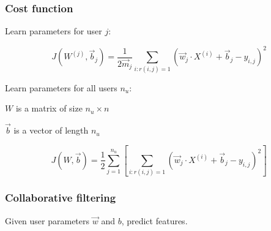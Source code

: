 \documentclass[12pt]{article}
\begin{document}
\subsubsection{Cost function}

Learn parameters for user $j$:

\[ J(W^{(j)},\vec{b}_j) = \frac{1}{2\vec m_j} \sum_{i:r(i,j)=1} (\vec w_j \cdot X^{(i)} + \vec b_j - y_{i,j})^2 \]

Learn parameters for all users $n_u$:

$W$ is a matrix of size $n_u \times n$

$\vec{b}$ is a vector of length $n_u$

\[ J(W,\vec{b}) = \frac{1}{2} \sum_{j=1}^{n_u} \left[ \sum_{i:r(i,j)=1} (\vec{w}_j \cdot X^{(i)} + \vec b_j - y_{i,j})^2 \right] \]

\subsubsection{Collaborative filtering}

Given user parameters $\vec{w}$ and $b$, predict features.
\end{document}
